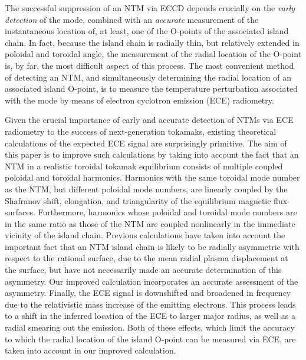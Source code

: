 \documentclass[12pt,prb,aps]{revtex4-1}
\begin{document}
The successful suppression of an NTM via ECCD depends crucially on the {\em early detection}\/ of the mode, combined with an {\em accurate}\/ measurement   of 
the instantaneous location of, at least, one of the O-points  of the associated island chain.\cite{eccd6} In fact, because the island chain is radially thin, 
but relatively extended in poloidal and toroidal angle, the measurement  of the radial location of the O-point is, by far,  the most difficult aspect of
this process. The most convenient method of  detecting an NTM, and simultaneously determining the radial location of an associated island O-point, is to measure the temperature perturbation associated with the mode by means of electron cyclotron emission (ECE) radiometry.\cite{ece1,ece2,ntm2,ece4}

Given the crucial importance of early and accurate detection of NTMs via ECE radiometry to the success of next-generation tokamaks, existing theoretical calculations of
the expected ECE signal are surprisingly primitive.\cite{eccd6,ece4,ece4a} The aim of this paper is to
improve such calculations by taking into account the fact that an NTM  in a realistic toroidal tokamak equilibrium consists of multiple coupled poloidal and toroidal harmonics. Harmonics with the same toroidal mode number as the NTM, but different poloidal mode numbers, are linearly coupled by the
Shafranov shift, elongation, and triangularity of the equilibrium magnetic flux-surfaces.\cite{tear2,tear3,tear5} Furthermore, harmonics whose poloidal and
toroidal mode numbers are in the same ratio as those of the NTM are coupled nonlinearly in the immediate vicinity of the island chain.\cite{ntm1,ntm2}
Previous calculations have taken into account the important fact that an NTM island chain is likely to be radially asymmetric with respect to the rational surface,\cite{ece6a,ece6} 
due to the mean radial plasma displacement at the  surface, but have not necessarily made an accurate
determination of this asymmetry.\cite{eccd6} Our improved calculation incorporates an accurate assessment of the asymmetry. Finally, the ECE signal 
is downshifted and broadened in frequency due to the relativistic mass increase of the emitting electrons.\cite{ece1,ece2,ece5}  This process leads to a shift in the inferred location
of the ECE  to larger major radius, as well as a radial smearing out the emission. Both of these effects, which limit the accuracy to which the
radial location of the island O-point can be measured via ECE,  are taken into account in our improved calculation.
\end{document}
